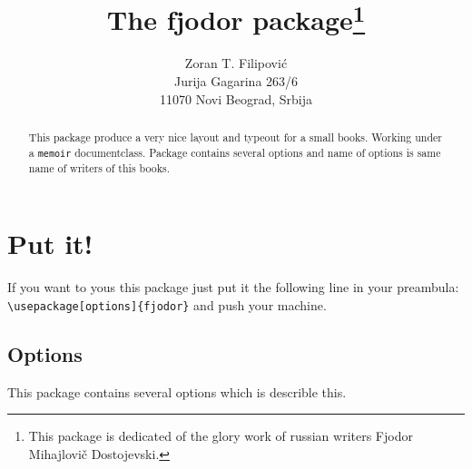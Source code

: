 \documentclass[a4paper,12pt]{article}
\title{The \textsf{fjodor} package\protect\footnote{This package 
is dedicated of the glory work of russian writers Fjodor Mihajlovi\v{c} Dostojevski.}}
\author{Zoran T. Filipovi\'{c} \\ 
        Jurija Gagarina 263/6 \\ 
        11070 Novi Beograd, Srbija}
\begin{document}
\frenchspacing
\maketitle
{}
\begin{abstract}
This package produce a very nice layout and typeout for a small books. Working 
under a \verb|memoir| documentclass. Package contains several options and name 
of options is same name of writers of this books. 
\end{abstract}

\section{Put it!}

If you want to yous this package just put it the following line in your preambula:
\verb|\usepackage[options]{fjodor}| and push your machine.

\subsection{Options}

This package contains several options which is describle this.
\end{document}
